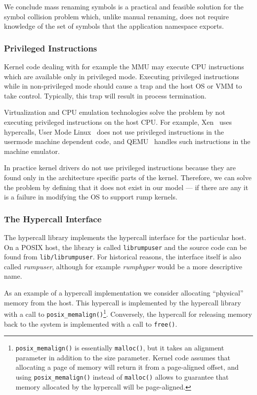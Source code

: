 We conclude mass renaming symbols is a practical and feasible
solution for the symbol collision problem which, unlike manual
renaming, does not require knowledge of the set of symbols that
the application namespace exports.

\subsubsection{Privileged Instructions}
\label{sect:privinst}

Kernel code dealing with for example the MMU may execute CPU
instructions which are available only in privileged mode.  Executing
privileged instructions while in non-privileged mode should cause
a trap and the host OS or VMM to take control.  Typically, this trap
will result in process termination.

Virtualization and CPU emulation technologies solve the problem by
not executing privileged instructions on the host CPU.
For example, Xen~\cite{barham:xen} uses hypercalls, User Mode
Linux~\cite{dike:uml} does not use privileged instructions in the
usermode machine dependent code, and QEMU~\cite{bellard:qemu}
handles such instructions in the machine emulator.

In practice kernel drivers do not use privileged instructions
because they are found only in the architecture specific parts of
the kernel.  Therefore, we can solve the problem by defining that
it does not exist in our model --- if there are any it is a failure
in modifying the OS to support rump kernels.

\subsubsection{The Hypercall Interface}
\label{sect:hypercall}

The hypercall library implements the hypercall interface for the
particular host.  On a POSIX host, the library is called
\texttt{librumpuser} and the source code can be found from
\texttt{lib/librumpuser}.  For historical reasons, the interface
itself is also called \textit{rumpuser}, although for example
\textit{rumphyper} would be a more descriptive name.

As an example of a hypercall implementation we consider allocating
``physical'' memory from the host.  This hypercall is implemented
by the hypercall library with a call to \verb+posix_memalign()+\footnote
{
	\texttt{posix\_memalign()} is essentially \texttt{malloc()}, but
	it takes an alignment parameter in addition to the size
	parameter.  Kernel code assumes that allocating a page of
	memory will return it from a page-aligned offset, and
	using \texttt{posix\_memalign()} instead of \texttt{malloc()}
	allows to guarantee that memory allocated by the hypercall
	will be page-aligned.
}.
Conversely, the hypercall for releasing memory back to the system
is implemented with a call to \verb+free()+.

